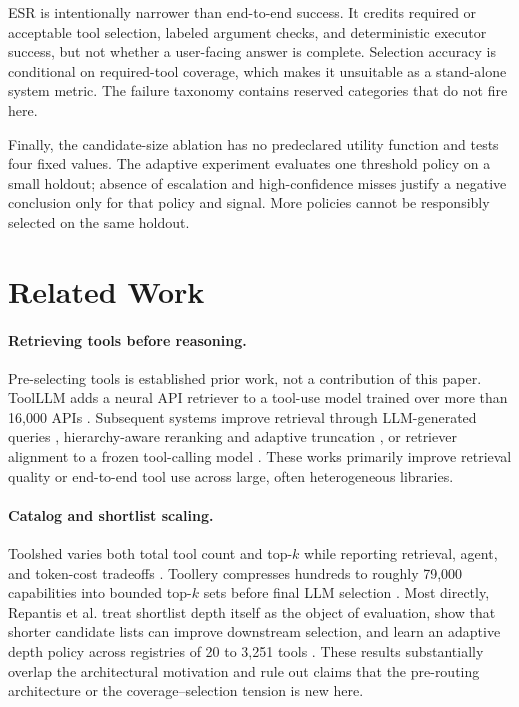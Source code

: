 \documentclass[10pt,twocolumn]{article}
\begin{document}
ESR is intentionally narrower than end-to-end success. It credits required or acceptable tool selection, labeled argument checks, and deterministic executor success, but not whether a user-facing answer is complete. Selection accuracy is conditional on required-tool coverage, which makes it unsuitable as a stand-alone system metric. The failure taxonomy contains reserved categories that do not fire here.

Finally, the candidate-size ablation has no predeclared utility function and tests four fixed values. The adaptive experiment evaluates one threshold policy on a small holdout; absence of escalation and high-confidence misses justify a negative conclusion only for that policy and signal. More policies cannot be responsibly selected on the same holdout.

\section{Related Work}

\paragraph{Retrieving tools before reasoning.}
Pre-selecting tools is established prior work, not a contribution of this paper. ToolLLM adds a neural API retriever to a tool-use model trained over more than 16,000 APIs \cite{qin2023toolllm}. Subsequent systems improve retrieval through LLM-generated queries \cite{kachuee2025querygeneration}, hierarchy-aware reranking and adaptive truncation \cite{zheng2024toolrerank}, or retriever alignment to a frozen tool-calling model \cite{molfetta2025ports}. These works primarily improve retrieval quality or end-to-end tool use across large, often heterogeneous libraries.

\paragraph{Catalog and shortlist scaling.}
Toolshed varies both total tool count and top-$k$ while reporting retrieval, agent, and token-cost tradeoffs \cite{lumer2024toolshed}. Toollery compresses hundreds to roughly 79,000 capabilities into bounded top-$k$ sets before final LLM selection \cite{tian2026toollery}. Most directly, Repantis et al. treat shortlist depth itself as the object of evaluation, show that shorter candidate lists can improve downstream selection, and learn an adaptive depth policy across registries of 20 to 3,251 tools \cite{repantis2026howmany}. These results substantially overlap the architectural motivation and rule out claims that the pre-routing architecture or the coverage--selection tension is new here.
\end{document}
